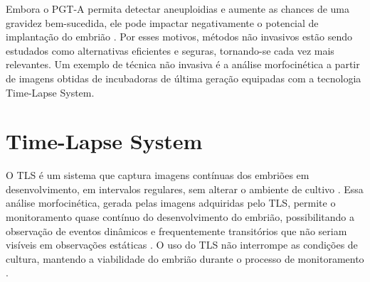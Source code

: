 \begin{figure}[h]
\begin{minipage}{\linewidth}
    \end{minipage}
\end{figure}
\FloatBarrier

Embora o PGT-A permita detectar aneuploidias e aumente as chances de uma gravidez bem-sucedida, ele pode impactar negativamente o potencial de implantação do embrião \cite{gleicher2021}. Por esses motivos, métodos não invasivos estão sendo estudados como alternativas eficientes e seguras, tornando-se cada vez mais relevantes. Um exemplo de técnica não invasiva é a análise morfocinética a partir de imagens obtidas de incubadoras de última geração equipadas com a tecnologia Time-Lapse System.

\section{Time-Lapse System}

O TLS é um sistema que captura imagens contínuas dos embriões em desenvolvimento, em intervalos regulares, sem alterar o ambiente de cultivo \cite{moustakli2024}. Essa análise morfocinética, gerada pelas imagens adquiridas pelo TLS, permite o monitoramento quase contínuo do desenvolvimento do embrião, possibilitando a observação de eventos dinâmicos e frequentemente transitórios que não seriam visíveis em observações estáticas \cite{boucret2021}. O uso do TLS não interrompe as condições de cultura, mantendo a viabilidade do embrião durante o processo de monitoramento \cite{moustakli2024}.


